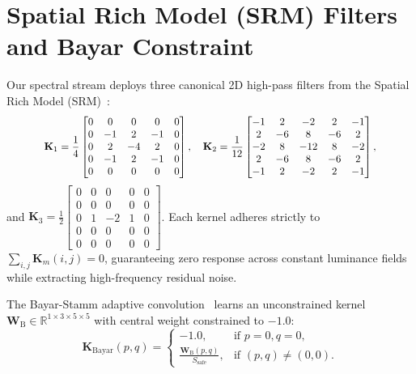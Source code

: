 \documentclass[10pt,twocolumn,letterpaper]{article}
\begin{document}
\section{Spatial Rich Model (SRM) Filters and Bayar Constraint}
\label{app:srm_kernels}

Our spectral stream deploys three canonical 2D high-pass filters from the Spatial Rich Model (SRM)~\cite{fridrich2012rich}:
\begin{equation}
\label{eq:srm_filters}
\resizebox{0.85\columnwidth}{!}{$\displaystyle
\mathbf{K}_1 = \frac{1}{4}\begin{bmatrix}
0 & 0 & 0 & 0 & 0 \\
0 & -1 & 2 & -1 & 0 \\
0 & 2 & -4 & 2 & 0 \\
0 & -1 & 2 & -1 & 0 \\
0 & 0 & 0 & 0 & 0
\end{bmatrix}, \quad
\mathbf{K}_2 = \frac{1}{12}\begin{bmatrix}
-1 & 2 & -2 & 2 & -1 \\
2 & -6 & 8 & -6 & 2 \\
-2 & 8 & -12 & 8 & -2 \\
2 & -6 & 8 & -6 & 2 \\
-1 & 2 & -2 & 2 & -1
\end{bmatrix},
$}
\end{equation}
and $\mathbf{K}_3 = \frac{1}{2} \begin{bmatrix} 0 & 0 & 0 & 0 & 0 \\ 0 & 0 & 0 & 0 & 0 \\ 0 & 1 & -2 & 1 & 0 \\ 0 & 0 & 0 & 0 & 0 \\ 0 & 0 & 0 & 0 & 0 \end{bmatrix}$. Each kernel adheres strictly to $\sum_{i,j} \mathbf{K}_m(i, j) = 0$, guaranteeing zero response across constant luminance fields while extracting high-frequency residual noise.

The Bayar-Stamm adaptive convolution~\cite{bayar2018constrained} learns an unconstrained kernel $\mathbf{W}_{\mathrm{B}} \in \mathbb{R}^{1 \times 3 \times 5 \times 5}$ with central weight constrained to $-1.0$:
\begin{equation}
\label{eq:bayar_normalized_kernel}
\mathbf{K}_{\mathrm{Bayar}}(p, q) = \begin{cases}
-1.0, & \text{if } p = 0, q = 0, \\
\frac{\mathbf{W}_{\mathrm{B}}(p, q)}{S_{\mathrm{safe}}}, & \text{if } (p, q) \ne (0, 0).
\end{cases}
\end{equation}
\end{document}
